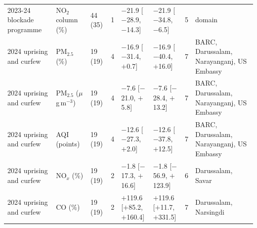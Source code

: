 \begin{longtable}{L{2.6cm} L{2.2cm} C{1.1cm} C{0.4cm} C{2.6cm} C{2.6cm} C{0.7cm} L{2.6cm}}
2023-24 blockade programme & NO$_2$ column (\%) & 44 (35) & 1 & $-$21.9 {\scriptsize[$-$28.9, $-$14.3]} & $-$21.9 {\scriptsize[$-$34.8, $-$6.5]} & 5 & domain \\
2024 uprising and curfew & PM$_{2.5}$ (\%) & 19 (19) & 4 & $-$16.9 {\scriptsize[$-$31.4, $+$0.7]} & $-$16.9 {\scriptsize[$-$40.4, $+$16.0]} & 7 & BARC, Darussalam, Narayanganj, US Embassy \\
2024 uprising and curfew & PM$_{2.5}$ ($\mu$g\,m$^{-3}$) & 19 (19) & 4 & $-$7.6 {\scriptsize[$-$21.0, $+$5.8]} & $-$7.6 {\scriptsize[$-$28.4, $+$13.2]} & 7 & BARC, Darussalam, Narayanganj, US Embassy \\
2024 uprising and curfew & AQI (points) & 19 (19) & 4 & $-$12.6 {\scriptsize[$-$27.3, $+$2.0]} & $-$12.6 {\scriptsize[$-$37.8, $+$12.5]} & 7 & BARC, Darussalam, Narayanganj, US Embassy \\
2024 uprising and curfew & NO$_x$ (\%) & 19 (19) & 2 & $-$1.8 {\scriptsize[$-$17.3, $+$16.6]} & $-$1.8 {\scriptsize[$-$56.9, $+$123.9]} & 6 & Darussalam, Savar \\
2024 uprising and curfew & CO (\%) & 19 (19) & 2 & $+$119.6 {\scriptsize[$+$85.2, $+$160.4]} & $+$119.6 {\scriptsize[$+$11.7, $+$331.5]} & 7 & Darussalam, Narsingdi \\
\end{longtable}
\endgroup
